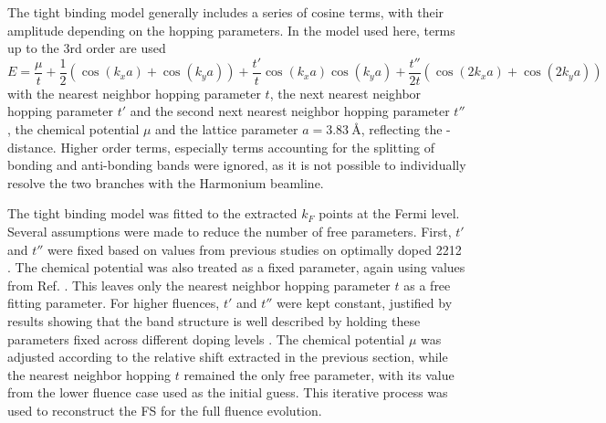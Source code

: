 The tight binding model generally includes a series of cosine terms, with their amplitude depending on the hopping parameters.
In the model used here, terms up to the 3rd order are used
\begin{equation}
	E = \frac{\mu}{t} + \frac{1}{2} \left(\cos(k_xa)+\cos(k_ya)\right) + \frac{t'}{t} \cos(k_xa)\cos(k_ya) + \frac{t''}{2t} \left(\cos(2k_xa)+\cos(2k_ya)\right)
\end{equation}
with the nearest neighbor hopping parameter $t$, the next nearest neighbor hopping parameter $t'$ and the second next nearest neighbor hopping parameter $t''$, the chemical potential $\mu$ and the lattice parameter $a=\qty{3.83}{\angstrom}$, reflecting the - distance.
Higher order terms, especially terms accounting for the splitting of bonding and anti-bonding bands were ignored, as it is not possible to individually resolve the two branches with the Harmonium beamline.

The tight binding model was fitted to the extracted $k_F$ points at the Fermi level.
Several assumptions were made to reduce the number of free parameters.
First, $t'$ and $t''$ were fixed based on values from previous studies on optimally doped 2212 \cite{kondo_hole-concentration_2004}.
The chemical potential was also treated as a fixed parameter, again using values from Ref. \cite{kondo_hole-concentration_2004}.
This leaves only the nearest neighbor hopping parameter $t$ as a free fitting parameter.
For higher fluences, $t'$ and $t''$ were kept constant, justified by results showing that the band structure is well described by holding these parameters fixed across different doping levels \cite{drozdov_phase_2018}.
The chemical potential $\mu$ was adjusted according to the relative shift extracted in the previous section, while the nearest neighbor hopping $t$ remained the only free parameter, with its value from the lower fluence case used as the initial guess.
This iterative process was used to reconstruct the FS for the full fluence evolution.

